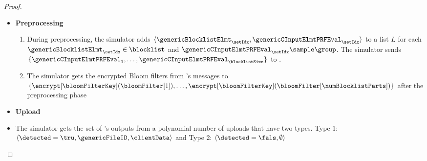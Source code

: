 \begin{proof}
\begin{itemize}
\item \textbf{Preprocessing}
\begin{enumerate}[resume]
\item During preprocessing, the simulator adds $\langle \genericBlocklistElmt_\setIdx, \genericCInputElmtPRFEval_\setIdx \rangle$ to a list $L$ for each $\genericBlocklistElmt_\setIdx \in \blocklist$ and $\genericCInputElmtPRFEval_\setIdx \sample \group$. The simulator sends $\{ \genericCInputElmtPRFEval_1, \dots, \genericCInputElmtPRFEval_\blocklistSize \}$ to \server. 
\item The simulator gets the encrypted Bloom filters from \server's messages to \client $\{\encrypt[\bloomFilterKey](\bloomFilter[1]), \dots, \encrypt[\bloomFilterKey](\bloomFilter[\numBlocklistParts])\}$ after the preprocessing phase
\end{enumerate}

\item \textbf{Upload}
\item The simulator gets the set of \server's outputs from a polynomial number of uploads that have two types. Type 1: $\langle \detected = \tru, \genericFileID, \clientData \rangle$ and Type 2: $\langle \detected = \fals, \emptyset \rangle$


\end{itemize}
\end{proof}
